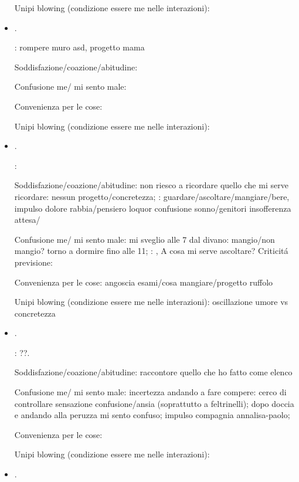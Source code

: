 \begin{itemize}
Unipi blowing (condizione essere me nelle interazioni):

\item {}.

: rompere muro asd, progetto mama

Soddisfazione/coazione/abitudine: 

Confusione me/ mi sento male:

Convenienza per le cose:

Unipi blowing (condizione essere me nelle interazioni):

\item {}.

: 

Soddisfazione/coazione/abitudine: non riesco a ricordare quello che mi serve ricordare: nessun progetto/concretezza; : guardare/ascoltare/mangiare/bere, impulso dolore rabbia/pensiero loquor confusione sonno/genitori insofferenza attesa/ 

Confusione me/ mi sento male: mi sveglio alle 7 dal divano: mangio/non mangio? torno a dormire fino alle 11; : ,   A cosa mi serve ascoltare? Criticit\'a previsione: 

Convenienza per le cose: angoscia esami/cosa mangiare/progetto ruffolo

Unipi blowing (condizione essere me nelle interazioni): oscillazione umore vs concretezza

\item {}.

: ??.

Soddisfazione/coazione/abitudine: raccontore quello che ho fatto come elenco

Confusione me/ mi sento male: incertezza andando a fare compere: cerco di controllare sensazione confusione/ansia (soprattutto a feltrinelli); dopo doccia e andando alla peruzza mi sento confuso; impulso compagnia annalisa-paolo;

Convenienza per le cose: 

Unipi blowing (condizione essere me nelle interazioni):

\item {}.


\end{itemize}
